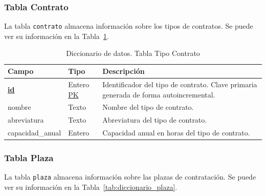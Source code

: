 \subsubsection{Tabla Contrato}
La tabla \texttt{contrato} almacena información sobre los tipos de contratos. Se puede ver su información en la Tabla~\ref{tab:diccionario_tipo_contrato}.

\begin{table}
  \centering 
  \begin{tabular}{l p{} p{}}
    \toprule
    \textbf{Campo} & \textbf{Tipo} & \textbf{Descripción}\\
    \midrule
    \textbf{\underline{id}} & Entero \underline{PK} & Identificador del tipo de contrato. Clave primaria generada de forma autoincremental. \\ \addlinespace
    nombre & Texto & Nombre del tipo de contrato. \\ \addlinespace
    abreviatura & Texto & Abreviatura del tipo de contrato. \\ \addlinespace
    capacidad\_anual & Entero & Capacidad anual en horas del tipo de contrato. \\
    \bottomrule
  \end{tabular}
  \caption{Diccionario de datos. Tabla Tipo Contrato}
  \label{tab:diccionario_tipo_contrato}
\end{table}

\subsubsection{Tabla Plaza}
La tabla \texttt{plaza} almacena información sobre las plazas de contratación. Se puede ver su información en la Tabla~\ref{tab:diccionario_plaza}.

